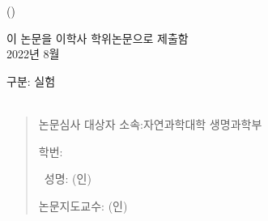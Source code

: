 
\begin{titlepage}
  \begin{spacing}{1.6}
    \makeatletter
    \begin{center}
      { \\}
      \vfill
      {\LARGE \@title\\}
      {\Large (\@titlealt)\\}

      \vfill

      {\Large
        이 논문을 이학사 학위논문으로 제출함 \\
        2022년 8월 \\
      }


      \vfill

      {\Large
        구분: 실험 \\
        \hfill\\
      }
    \end{center}
    \begin{quote}
      {\large
        논문심사 대상자 소속:\hfill 자연과학대학 생명과학부 \hfill \phantom{(인)} \par
        \phantom{논문심사 대상자} 학번: \hfill \@studentid \hfill \phantom{(인)} \par
        \phantom{논문심사 대상자}\ 성명: \hfill \@author \hfill (인) \par
        \par
        논문지도교수: \hfill \@advisor \hfill (인)
      }
    \end{quote}

    \vspace*{2cm}
    \makeatother
  \end{spacing}
\end{titlepage}
